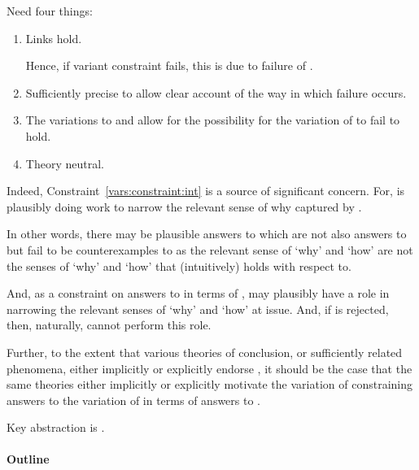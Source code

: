 \begin{note}
  Need four things:
  \begin{enumerate}[label=\alph*., ref=(\alph*)]
  \item
    \label{vars:constraint:int}
    Links hold.

    Hence, if variant constraint fails, this is due to failure of \issueInclusion{}.
  \item
    Sufficiently precise to allow clear account of the way in which failure occurs.
  \item
    \label{vars:constraint:ce}
    The variations to \qWhy{} and \qHow{} allow for the possibility for the variation of \issueInclusion{} to fail to hold.
  \item
    Theory neutral.
  \end{enumerate}

  Indeed, Constraint~\ref{vars:constraint:int} is a source of significant concern.
  For, \issueInclusion{} is plausibly doing work to narrow the relevant sense of why captured by \qWhy{}.

  In other words, there may be plausible answers to \qWhy{} which are not also answers to \qHow{} but fail to be counterexamples to \issueInclusion{} as the relevant sense of `why' and `how' are not the senses of `why' and `how' that \issueInclusion{} (intuitively) holds with respect to.

  And, as a constraint on answers to \qWhy{} in terms of \qHow{}, \issueInclusion{} may plausibly have a role in narrowing the relevant senses of `why' and `how' at issue.
  And, if \issueInclusion{} is rejected, then, naturally, \issueInclusion{} cannot perform this role.

  Further, to the extent that various theories of conclusion, or sufficiently related phenomena, either implicitly or explicitly endorse \issueInclusion{}, it should be the case that the same theories either implicitly or explicitly motivate the variation of \issueConstraint{} constraining answers to the variation of \qWhy{} in terms of answers to \qHow{}.
\end{note}

\begin{note}
  Key abstraction is .
\end{note}

\paragraph*{Outline}


